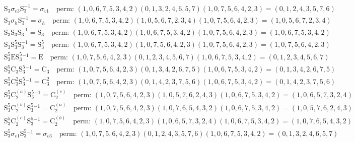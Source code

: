 \begin{align*}
& \mathrm{S}_{3} \sigma_{v3} \mathrm{S}_{3}^{-1} = \sigma_{v1} \quad \text{perm: }(1, 0, 6, 7, 5, 3, 4, 2)(0, 1, 3, 2, 4, 6, 5, 7)(1, 0, 7, 5, 6, 4, 2, 3) = (0, 1, 2, 4, 3, 5, 7, 6) \\
& \mathrm{S}_{3} \sigma_{h} \mathrm{S}_{3}^{-1} = \sigma_{h} \quad \text{perm: }(1, 0, 6, 7, 5, 3, 4, 2)(1, 0, 5, 6, 7, 2, 3, 4)(1, 0, 7, 5, 6, 4, 2, 3) = (1, 0, 5, 6, 7, 2, 3, 4) \\
& \mathrm{S}_{3} \mathrm{S}_{3} \mathrm{S}_{3}^{-1} = \mathrm{S}_{3} \quad \text{perm: }(1, 0, 6, 7, 5, 3, 4, 2)(1, 0, 6, 7, 5, 3, 4, 2)(1, 0, 7, 5, 6, 4, 2, 3) = (1, 0, 6, 7, 5, 3, 4, 2) \\
& \mathrm{S}_{3} \mathrm{S}_{3}^{5} \mathrm{S}_{3}^{-1} = \mathrm{S}_{3}^{5} \quad \text{perm: }(1, 0, 6, 7, 5, 3, 4, 2)(1, 0, 7, 5, 6, 4, 2, 3)(1, 0, 7, 5, 6, 4, 2, 3) = (1, 0, 7, 5, 6, 4, 2, 3) \\
& \mathrm{S}_{3}^{5} \mathrm{E} \mathrm{S}_{3}^{5}^{-1} = \mathrm{E} \quad \text{perm: }(1, 0, 7, 5, 6, 4, 2, 3)(0, 1, 2, 3, 4, 5, 6, 7)(1, 0, 6, 7, 5, 3, 4, 2) = (0, 1, 2, 3, 4, 5, 6, 7) \\
& \mathrm{S}_{3}^{5} \mathrm{C}_{3} \mathrm{S}_{3}^{5}^{-1} = \mathrm{C}_{3} \quad \text{perm: }(1, 0, 7, 5, 6, 4, 2, 3)(0, 1, 3, 4, 2, 6, 7, 5)(1, 0, 6, 7, 5, 3, 4, 2) = (0, 1, 3, 4, 2, 6, 7, 5) \\
& \mathrm{S}_{3}^{5} \mathrm{C}_{3}^{2} \mathrm{S}_{3}^{5}^{-1} = \mathrm{C}_{3}^{2} \quad \text{perm: }(1, 0, 7, 5, 6, 4, 2, 3)(0, 1, 4, 2, 3, 7, 5, 6)(1, 0, 6, 7, 5, 3, 4, 2) = (0, 1, 4, 2, 3, 7, 5, 6) \\
& \mathrm{S}_{3}^{5} \mathrm{C}_{2}^{(a)} \mathrm{S}_{3}^{5}^{-1} = \mathrm{C}_{2}^{(c)} \quad \text{perm: }(1, 0, 7, 5, 6, 4, 2, 3)(1, 0, 5, 7, 6, 2, 4, 3)(1, 0, 6, 7, 5, 3, 4, 2) = (1, 0, 6, 5, 7, 3, 2, 4) \\
& \mathrm{S}_{3}^{5} \mathrm{C}_{2}^{(b)} \mathrm{S}_{3}^{5}^{-1} = \mathrm{C}_{2}^{(a)} \quad \text{perm: }(1, 0, 7, 5, 6, 4, 2, 3)(1, 0, 7, 6, 5, 4, 3, 2)(1, 0, 6, 7, 5, 3, 4, 2) = (1, 0, 5, 7, 6, 2, 4, 3) \\
& \mathrm{S}_{3}^{5} \mathrm{C}_{2}^{(c)} \mathrm{S}_{3}^{5}^{-1} = \mathrm{C}_{2}^{(b)} \quad \text{perm: }(1, 0, 7, 5, 6, 4, 2, 3)(1, 0, 6, 5, 7, 3, 2, 4)(1, 0, 6, 7, 5, 3, 4, 2) = (1, 0, 7, 6, 5, 4, 3, 2) \\
& \mathrm{S}_{3}^{5} \sigma_{v1} \mathrm{S}_{3}^{5}^{-1} = \sigma_{v3} \quad \text{perm: }(1, 0, 7, 5, 6, 4, 2, 3)(0, 1, 2, 4, 3, 5, 7, 6)(1, 0, 6, 7, 5, 3, 4, 2) = (0, 1, 3, 2, 4, 6, 5, 7) \\

\end{align*}

